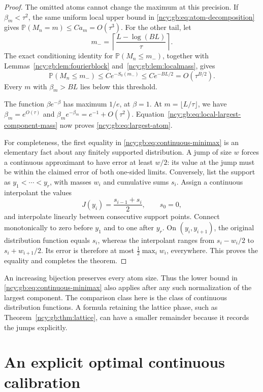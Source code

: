 \documentclass[11pt,letterpaper]{article}
\numberwithin{equation}{section}
\theoremstyle{remark}\newtheorem{remark}[theorem]{Remark}
\theoremstyle{definition}\newtheorem{definition}[theorem]{Definition}\theoremstyle{plain}
\newcommand{\Pbb}{\mathbb P}
\begin{document}
\begin{proof}
The omitted atoms cannot change the maximum at this precision.  If
$\beta_m<\tau^2$, the same uniform local upper bound in
\eqref{ncy:gb:eq:atom-decomposition} gives
$\Pbb(M_n=m)\le C a_m=O(\tau^3)$.
For the other tail, let
\[
 m_- =\left\lceil\frac{L-\log(BL)}\tau\right\rceil.
\]
The exact conditioning identity for $\Pbb(M_n\le m_-)$, together
with Lemmas~\ref{ncy:gb:lem:fourierblock} and~\ref{ncy:gb:lem:localmass}, gives
\[
 \Pbb(M_n\le m_-)\le C e^{-S_0(m_-)}
   \le C e^{-BL/2}=O(\tau^{B/2}).
\]
Every $m$ with $\beta_m>BL$ lies below this threshold.

The function $\beta e^{-\beta}$ has maximum $1/e$, at $\beta=1$.
At $m=\lfloor L/\tau\rfloor$, we have
$\beta_m=e^{O(\tau)}$ and
$\beta_me^{-\beta_m}=e^{-1}+O(\tau^2)$.
Equation~\eqref{ncy:gb:eq:local-largest-component-mass} now proves
\eqref{ncy:gb:eq:largest-atom}.

For completeness, the first equality in
\eqref{ncy:gb:eq:continuous-minimax} is an elementary fact about any finitely
supported distribution.  A jump of size $w$ forces a continuous
approximant to have error at least $w/2$: its value at the jump must
be within the claimed error of both one-sided limits.
Conversely, list the support as $y_1<\cdots<y_r$, with masses $w_i$
and cumulative sums $s_i$.  Assign a continuous interpolant the values
\[
 J(y_i)=\frac{s_{i-1}+s_i}{2},\qquad s_0=0,
\]
and interpolate linearly between consecutive support points.
Connect monotonically to zero before $y_1$ and to one after $y_r$.
On $(y_i,y_{i+1})$, the original distribution function equals $s_i$,
whereas the interpolant ranges from $s_i-w_i/2$ to
$s_i+w_{i+1}/2$.  Its error is therefore at most
$\tfrac12\max_iw_i$, everywhere.  This proves the equality and
completes the theorem.
\end{proof}

An increasing bijection preserves every atom size.  Thus the lower bound
in \eqref{ncy:gb:eq:continuous-minimax} also applies after any such
normalization of the largest component.  The comparison class here is
the class of continuous distribution functions.  A formula retaining
the lattice phase, such as Theorem~\ref{ncy:gb:thm:lattice}, can have a smaller
remainder because it records the jumps explicitly.

\section{An explicit optimal continuous calibration}
\label{ncy:gb:sec:optimal-calibration}
\label{ncy:gb:sec:optimal}
\end{document}

